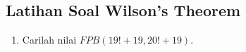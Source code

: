 \subsection{Latihan Soal Wilson's Theorem}
\begin{enumerate}
    \item Carilah nilai $FPB(19!+19,20!+19).$
\end{enumerate}